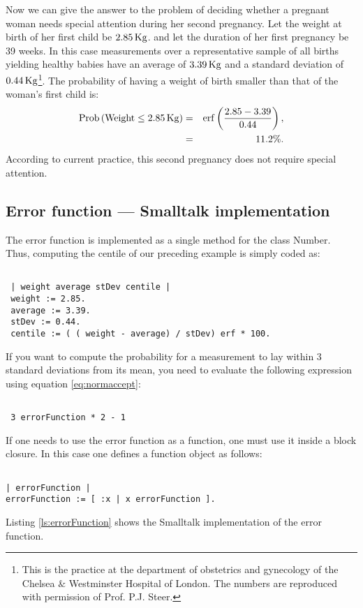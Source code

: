 \documentclass[twoside]{book}
\begin{document}
\def\w{2.85}\def\av{3.39}\def\st{0.44}
 Now we can give the answer to the problem of deciding
whether a pregnant woman needs special attention during her second
pregnancy. Let the weight at birth of her first child be $\w\kg$.
and let the duration of her first pregnancy be 39 weeks. In this
case measurements over a representative sample of all births
yielding healthy babies have an average of $\av\kg$ and a standard
deviation of $\st\kg$\footnote{\label{ft:steer}This is the
practice at the department of obstetrics and gynecology of the
Chelsea $\&$ Westminster Hospital of London. The numbers are
reproduced with permission of Prof. P.J. Steer.}. The probability
of having a weight of birth smaller than that of the woman's first
child is:
\begin{eqnarray*}
\prob\left(\mathop{\rm Weight}\le \w\kg \right) & = &
\erf\left({\w-\av\over\st}\right),\\ & = & 11.2\%.
\end{eqnarray*}
According to current practice, this second pregnancy does not
require special attention.

\subsection{Error function --- Smalltalk implementation}
\label{sec:sterrorfunction}  The error function is
implemented as a single method for the class Number. Thus,
computing the centile of our preceding example is simply coded as:
\begin{codeExample}
\begin{verbatim}

 | weight average stDev centile |
 weight := 2.85.
 average := 3.39.
 stDev := 0.44.
 centile := ( ( weight - average) / stDev) erf * 100.
\end{verbatim}
\end{codeExample}
If you want to compute the probability for a measurement to lay
within 3 standard deviations from its mean, you need to evaluate
the following expression using equation \ref{eq:normaccept}:
\begin{codeExample}
\begin{verbatim}

 3 errorFunction * 2 - 1
\end{verbatim}
\end{codeExample}
If one needs to use the error function as a function, one must use
it inside a block closure. In this case one defines a function
object as follows:
\begin{codeExample}
\begin{verbatim}

| errorFunction |
errorFunction := [ :x | x errorFunction ].
\end{verbatim}
\end{codeExample}
Listing \ref{ls:errorFunction} shows the Smalltalk implementation
of the error function.
\end{document}

